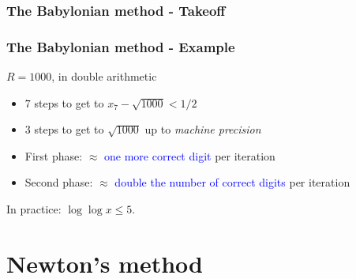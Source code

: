 \documentclass{beamer}
\begin{document}
\begin{frame}
  \frametitle{The Babylonian method - Takeoff}

\end{frame}

\begin{frame}
  \frametitle{The Babylonian method - Example}
  $R=1000$, in double arithmetic
  \begin{itemize}
    \item $7$ steps to get to $x_7 - \sqrt{1000} < 1/2$
          \item $3$ steps to get to $\sqrt{1000}$ up to \textit{machine precision}
          \item First phase: $\approx$ \textcolor{blue}{one more correct digit} per iteration
          \item Second phase: $\approx$ \textcolor{blue}{double the number of correct digits} per iteration
  \end{itemize}

  \begin{center}
    In practice: $\log \log x \le 5$.
  \end{center}

\end{frame}


\section{Newton's method}%
\end{document}
